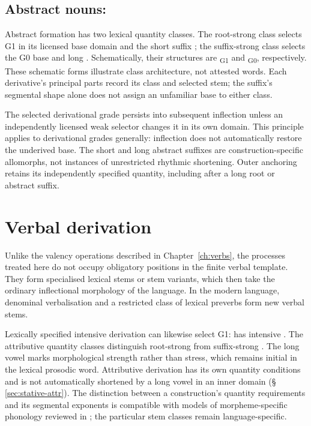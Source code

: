 \subsection{Abstract nouns: }

Abstract formation has two lexical quantity classes. The root-strong class
selects G1 in its licensed base domain and the short suffix
; the suffix-strong class selects the G0 base and long
. Schematically, their structures are
\textsubscript{G1} and
\textsubscript{G0}, respectively. These schematic
forms illustrate class architecture, not attested words. Each derivative's
principal parts record its class and selected stem; the suffix's segmental
shape alone does not assign an unfamiliar base to either class.

The selected derivational grade persists into subsequent inflection unless
an independently licensed weak selector changes it in its own domain. This
principle applies to derivational grades generally: inflection does not
automatically restore the underived base. The short and long abstract
suffixes are construction-specific allomorphs, not instances of unrestricted
rhythmic shortening. Outer anchoring retains its independently specified
quantity, including after a long root or abstract suffix.


\section{Verbal derivation}

Unlike the valency operations described in Chapter~\ref{ch:verbs}, the
processes treated here do not occupy obligatory positions in the finite verbal
template. They form specialised lexical stems or stem variants, which then
take the ordinary inflectional morphology of the language. In the modern
language, denominal verbalisation and a restricted class of lexical preverbs
form new verbal stems.

Lexically specified intensive derivation can likewise select G1: 
has intensive . The attributive quantity classes distinguish
root-strong  from suffix-strong . The long vowel
marks morphological strength rather than stress, which remains initial in
the lexical prosodic word. Attributive derivation has its own quantity
conditions and is not automatically shortened by a long vowel in an inner
domain (§\,\ref{sec:stative-attr}).
The distinction between a construction's quantity requirements and its
segmental exponents is compatible with models of morpheme-specific phonology
reviewed in \cite{inkelas2017}; the particular stem classes remain
language-specific.

